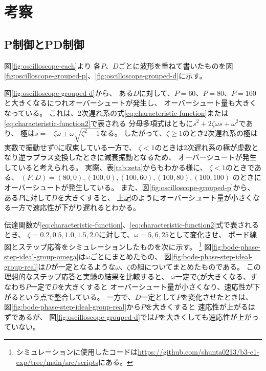\documentclass[../../../main]{subfiles}
\begin{document}
\section{考察}\label{sec:consideration}

\subsection{P制御とPD制御}

図\ref{fig:oscilloscope-each}より
各$P$、$D$ごとに波形を重ねて書いたものを図\ref{fig:oscilloscope-grouped-p}、\ref{fig:oscilloscope-grouped-d}に示す。


図\ref{fig:oscilloscope-grouped-d}から、
ある$D$に対して、$P=60$、$P=80$、$P=100$と大きくなるにつれオーバーシュートが発生し、
オーバーシュート量も大きくなっている。
これは、2次遅れ系の式\ref{eq:characteristic-function}または\ref{eq:characteristic-function2}で表される
分母多項式はともに$s^2+2\zeta\omega s+\omega^2$であり、
極は$s=-\zeta\omega \pm \omega \sqrt{\zeta^2-1}$なる。
したがって、$\zeta\geq1$のとき2次遅れ系の極は実数で振動せず0に収束している一方で、
$\zeta<1$のときは2次遅れ系の極が虚数となり逆ラプラス変換したときに減衰振動となるため、
オーバーシュートが発生していると考えられる。
実際、表\ref{tab:zeta}からもわかる様に、
$\zeta<1$のときである、
$(P, D) = (80, 0), (100, 0), (100, 60), (100, 80), (100, 100)$
のときにオーバーシュートが発生している。
また、図\ref{fig:oscilloscope-grouped-p}から、
ある$P$に対して$D$を大きくすると、
上記のようにオーバーシュート量が小さくなる一方で速応性が下がり遅れるとわかる。


伝達関数が\ref{eq:characteristic-function}、\ref{eq:characteristic-function2}式で表されるとき、
$\zeta=0.2, 0.5, 1.0, 1.5, 2.0$に対して、$\omega=5, 6, 25$として変化させ、
ボード線図とステップ応答をシミュレーションしたものを次に示す。
\footnote{
	シミュレーションに使用したコードは\url{https://github.com/shunta0213/b3-e1-exp/tree/main/src/scripts}にある。
}
図\ref{fig:bode-phase-step-ideal-group-omega}は$\omega$ごとにまとめたもの、
図\ref{fig:bode-phase-step-ideal-group-real}は$D$が一定となるような$\omega$、$\zeta$の組についてまとめたものである。
この理想的なステップ応答と実験の結果を比較すると、
$\omega$一定で$\zeta$が大きくなる、すなわち$P$一定で$D$を大きくすると
オーバーシュート量が小さくなり、速応性が下がるという点で整合している。
一方で、$D$一定として$P$を変化させたときは、
図\ref{fig:bode-phase-step-ideal-group-real}から$P$を大きくすると
速応性が上がるはずであるが、
図\ref{fig:oscilloscope-grouped-d}では$P$を大きくしても速応性が上がっていない。




\end{document}
